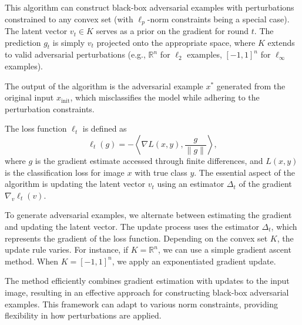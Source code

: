 This algorithm can construct black-box adversarial examples with perturbations constrained to any convex set (with $\ell_p$-norm constraints being a special case). The latent vector $v_t \in K$ serves as a prior on the gradient for round $t$. The prediction $g_t$ is simply $v_t$ projected onto the appropriate space, where $K$ extends to valid adversarial perturbations (e.g., $\mathbb{R}^n$ for $\ell_2$ examples, $[-1, 1]^n$ for $\ell_\infty$ examples).

The output of the algorithm is the adversarial example $x^*$ generated from the original input $x_{\text{init}}$, which misclassifies the model while adhering to the perturbation constraints.

The loss function $\ell_t$ is defined as
\[
\ell_t(g) = -\left\langle \nabla L(x, y), \frac{g}{\|g\|} \right\rangle,
\]
where $g$ is the gradient estimate accessed through finite differences, and $L(x, y)$ is the classification loss for image $x$ with true class $y$. The essential aspect of the algorithm is updating the latent vector $v_t$ using an estimator $\Delta_t$ of the gradient $\nabla_v \ell_t(v)$.

To generate adversarial examples, we alternate between estimating the gradient and updating the latent vector. The update process uses the estimator $\Delta_t$, which represents the gradient of the loss function. Depending on the convex set $K$, the update rule varies. For instance, if $K = \mathbb{R}^n$, we can use a simple gradient ascent method. When $K = [-1, 1]^n$, we apply an exponentiated gradient update.

The method efficiently combines gradient estimation with updates to the input image, resulting in an effective approach for constructing black-box adversarial examples. This framework can adapt to various norm constraints, providing flexibility in how perturbations are applied.
